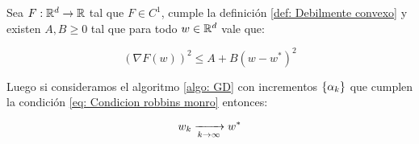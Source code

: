 \begin{theorem}
	\label{theorem: convergencia puntual batch, objetivo debilmente convexo, incrementos decrecientes}
	Sea $F: {\mathbb{R}}^d \rightarrow {\mathbb{R}}$ tal que  $F\in C^1$, cumple la definici\'on \ref{def: Debilmente convexo} y existen $A,B \geq 0$ tal que para todo $w \in {\mathbb{R}}^d$ vale que:
	
	\begin{equation}
	\label{eq: Condicion gradiente acotado, ctp, batch}
		\left(\nabla F(w)\right)^2 \leq A + B \left(w - w^*\right)^2
	\end{equation}
	
	Luego si consideramos el algoritmo \ref{algo: GD} con incrementos $\left\lbrace\alpha_k\right\rbrace$ que cumplen la condici\'on \ref{eq: Condicion robbins monro} entonces:
	
	\begin{equation}
		w_k \xrightarrow[k \rightarrow \infty]{} w^*
	\end{equation}
	
\end{theorem}

